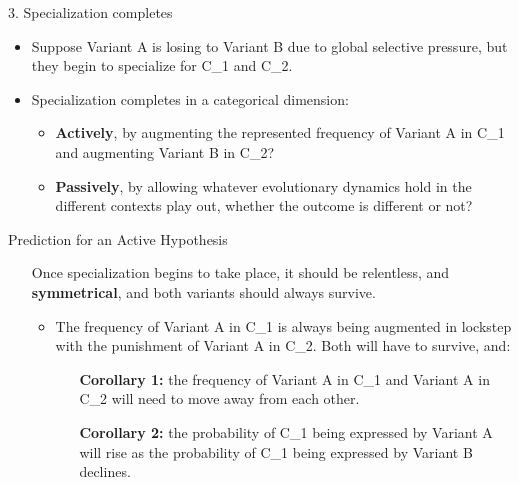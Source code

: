 \documentclass[hyperref={pdfpagelabels=false}]{beamer}
\begin{document}
\begin{frame}{3. Specialization completes}
\begin{itemize}
	\item Suppose Variant A is losing to Variant B due to global selective pressure, but they begin to specialize for C_1 and C_2.
	\item Specialization completes in a categorical dimension:
	\begin{itemize}
		\item \textbf{Actively}, by augmenting the represented frequency of Variant A in C_1 and augmenting Variant B in C_2?
		\item \textbf{Passively}, by allowing whatever evolutionary dynamics hold in the different contexts play out, whether the outcome is different or not?
	\end{itemize}
\end{itemize}
\end{frame}


\begin{frame}{Prediction for an Active Hypothesis}
		\begin{itemize}
			\item[] Once specialization begins to take place, it should be relentless, and \textbf{symmetrical}, and both variants should always survive.
				\begin{itemize}
					\item The frequency of Variant A in C_1 is always being augmented in lockstep with the punishment of Variant A in C_2. Both will have to survive, and:
					\begin{itemize}
					\item[\textbf{Corollary 1:}] the frequency of Variant A in C_1 and Variant A in C_2 will need to move away from each other.
					\item[\textbf{Corollary 2:}] the probability of C_1 being expressed by Variant A will rise as the probability of C_1 being expressed by Variant B declines.
					\end{itemize}
				\end{itemize}
		\end{itemize}
\end{frame}
\end{document}

